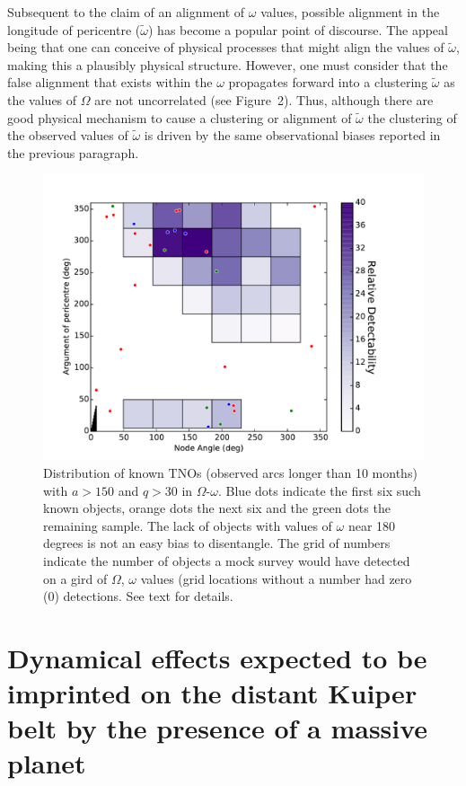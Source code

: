 \documentclass{aastex62}
\begin{document}
Subsequent to the claim of an alignment of $\omega$ values, possible alignment in the longitude of pericentre ($\tilde{\omega}$) has become a popular point of discourse.  The appeal being that one can conceive of physical processes that might align the values of $\tilde{\omega}$, making this a plausibly physical structure.  However, one must consider that the false alignment that exists within the $\omega$ propagates forward into a clustering $\tilde{\omega}$ as the values of $\Omega$ are not uncorrelated (see Figure~2).  Thus, although there are good physical mechanism to cause a clustering or alignment of  $\tilde{\omega}$ the clustering of the observed values of $\tilde{\omega}$ is driven by the same observational biases reported in the previous paragraph.

\begin{figure}
\centering
\includegraphics[width=\textwidth]{figure2.pdf}
\caption{Distribution of known TNOs (observed arcs longer than 10 months) with $a > 150$ and $q > 30$ in $\Omega$-$\omega$.  Blue dots indicate the first six such known objects, orange dots the next six and the green dots the remaining sample.  The lack of objects with values of $\omega$ near 180 degrees is not an easy bias to disentangle.  The grid of numbers indicate the number of objects a mock survey would have detected on a gird of $\Omega$, $\omega$ values (grid locations without a number had zero (0) detections.  See text for details.}
\label{fig:bias}
\end{figure}

\section{Dynamical effects expected to be imprinted on the distant Kuiper belt by the presence of a massive planet}
\end{document}
